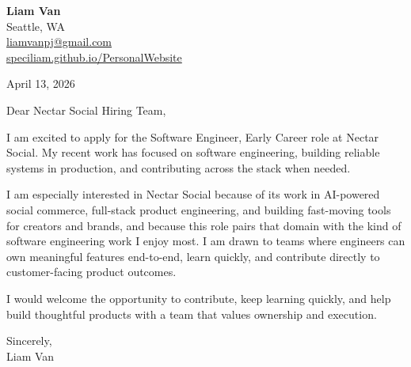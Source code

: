 \documentclass[letterpaper,11pt]{article}
\begin{document}
\begin{flushleft}
\textbf{\Large Liam Van} \\
Seattle, WA \\
\href{mailto:liamvanpj@gmail.com}{liamvanpj@gmail.com} \\
\href{https://speciliam.github.io/PersonalWebsite}{speciliam.github.io/PersonalWebsite}
\end{flushleft}

April 13, 2026

\noindent Dear Nectar Social Hiring Team,

\noindent I am excited to apply for the Software Engineer, Early Career role at Nectar Social. My recent work has focused on software engineering, building reliable systems in production, and contributing across the stack when needed.

\noindent I am especially interested in Nectar Social because of its work in AI-powered social commerce, full-stack product engineering, and building fast-moving tools for creators and brands, and because this role pairs that domain with the kind of software engineering work I enjoy most. I am drawn to teams where engineers can own meaningful features end-to-end, learn quickly, and contribute directly to customer-facing product outcomes.

\noindent I would welcome the opportunity to contribute, keep learning quickly, and help build thoughtful products with a team that values ownership and execution.

\noindent Sincerely, \\
Liam Van
\end{document}
